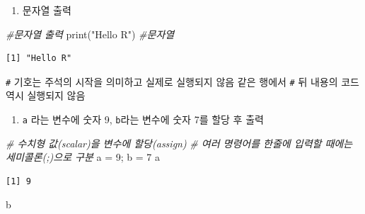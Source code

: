 \documentclass[
  11pt,
]{krantz}
\makeatletter
\newenvironment{Shaded}{\begin{snugshade}}{\end{snugshade}}
\newcommand{\CommentTok}[1]{\textcolor[rgb]{0.37,0.37,0.37}{\textit{#1}}}
\newcommand{\DecValTok}[1]{\textcolor[rgb]{0.06,0.06,0.06}{#1}}
\newcommand{\FunctionTok}[1]{\textcolor[rgb]{0,0,0}{#1}}
\newcommand{\NormalTok}[1]{#1}
\newcommand{\OtherTok}[1]{\textcolor[rgb]{0.37,0.37,0.37}{#1}}
\newcommand{\StringTok}[1]{\textcolor[rgb]{0.5,0.5,0.5}{#1}}
\providecommand{\tightlist}{%
  \setlength{\itemsep}{0pt}\setlength{\parskip}{0pt}}
\newenvironment{kframe}{%
\medskip{}
\setlength{\fboxsep}{.8em}
 \def\at@end@of@kframe{}%
 \ifinner\ifhmode%
  \def\at@end@of@kframe{\end{minipage}}%
  \begin{minipage}{\columnwidth}%
 \fi\fi%
 \def\FrameCommand##1{\hskip\@totalleftmargin \hskip-\fboxsep
 \colorbox{shadecolor}{##1}\hskip-\fboxsep
     \hskip-\linewidth \hskip-\@totalleftmargin \hskip\columnwidth}%
 \MakeFramed {\advance\hsize-\width
   \@totalleftmargin\z@ \linewidth\hsize
   \@setminipage}}%
 {\par\unskip\endMakeFramed%
 \at@end@of@kframe}
\renewenvironment{quote}{\begin{kframe}}{\end{kframe}}
\makeatother
\begin{document}
\normalsize

\begin{enumerate}
\def\labelenumi{\arabic{enumi}.}
\setcounter{enumi}{1}
\tightlist
\item
  문자열 출력
\end{enumerate}

\footnotesize

\begin{Shaded}
\begin{Highlighting}[]
\CommentTok{\#문자열 출력}
\FunctionTok{print}\NormalTok{(}\StringTok{"Hello R"}\NormalTok{) }\CommentTok{\#문자열}
\end{Highlighting}
\end{Shaded}

\begin{verbatim}
[1] "Hello R"
\end{verbatim}

\normalsize

\begin{quote}
\texttt{\#} 기호는 주석의 시작을 의미하고 실제로 실행되지 않음 같은 행에서 \texttt{\#} 뒤 내용의 코드 역시 실행되지 않음
\end{quote}

\begin{enumerate}
\def\labelenumi{\arabic{enumi}.}
\setcounter{enumi}{2}
\tightlist
\item
  \texttt{a} 라는 변수에 숫자 9, \texttt{b}라는 변수에 숫자 7를 할당 후 출력
\end{enumerate}

\footnotesize

\begin{Shaded}
\begin{Highlighting}[]
\CommentTok{\# 수치형 값(scalar)을 변수에 할당(assign)}
\CommentTok{\# 여러 명령어를 한줄에 입력할 때에는 세미콜론(;)으로 구분}
\NormalTok{a }\OtherTok{=} \DecValTok{9}\NormalTok{; b }\OtherTok{=} \DecValTok{7}
\NormalTok{a}
\end{Highlighting}
\end{Shaded}

\begin{verbatim}
[1] 9
\end{verbatim}

\begin{Shaded}
\begin{Highlighting}[]
\NormalTok{b}
\end{Highlighting}
\end{Shaded}
\end{document}
